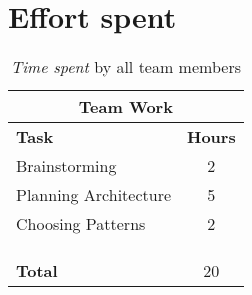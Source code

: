 \documentclass[../RASD.tex]{subfiles}
\begin{document}
    \chapter{Effort spent}\label{ch:effort-spent}
    \begin{table}[h]
        \centering
        \begin{tabular}{l c}
            \hline\hline
            \multicolumn{2}{c}{\textbf{Team Work}} \\
            \hline
            \textbf{Task} & \textbf{Hours} \\ [0.5ex]
            \hline
            Brainstorming & 2 \\
            Planning Architecture & 5 \\
            Choosing Patterns & 2 \\
             &  \\
             &  \\
             &   \\
            \hline
            \textbf{Total} & 20  \\
            \hline
        \end{tabular}
        \caption{\textit{Time spent} by all team members}
        \label{fig:Time spent by all team members}
    \end{table}
\end{document}
